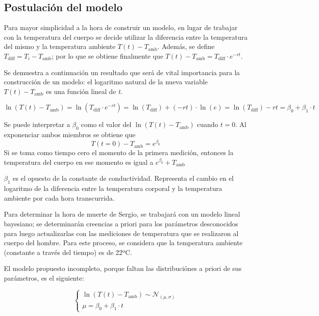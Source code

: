 \documentclass[
]{article}
\begin{document}
\hypertarget{postulaciuxf3n-del-modelo}{%
\subsection{Postulación del modelo}\label{postulaciuxf3n-del-modelo}}

Para mayor simplicidad a la hora de construir un modelo, en lugar de
trabajar con la temperatura del cuerpo se decide utilizar la diferencia
entre la temperatura del mismo y la temperatura ambiente
\(T(t) - T_{\mathrm{amb}}\). Además, se define
\(T_{\mathrm{diff}} = T_i - T_{\mathrm{amb}}\); por lo que se obtiene
finalmente que
\(T(t) - T_{\mathrm{amb}} = T_{\mathrm{diff}} \cdot e ^ {-rt}\).

Se demuestra a continuación un resultado que será de vital importancia
para la construcción de un modelo: el logaritmo natural de la nueva
variable \(T(t) - T_{\mathrm{amb}}\) es una función lineal de \emph{t}.

\[ \ln(T(t) - T_{\mathrm{amb}}) = \ln( T_{\mathrm{diff}} \cdot e^{-rt}) = \ln(T_{\mathrm{diff}}) + (-rt) \cdot \ln (e) = \ln(T_{\mathrm{diff}}) - rt = \beta_{0} + \beta_{1}\cdot t \tag{2}\]

Se puede interpretar a \(\beta_{0}\) como el valor del
\(\ln(T(t) - T_{\mathrm{amb}})\) cuando \(t=0\). Al exponenciar ambos
miembros se obtiene que \[ T(t=0) - T_{\mathrm{amb}} = e^{\beta_0}\] Si
se toma como tiempo cero el momento de la primera medición, entonces la
temperatura del cuerpo en ese momento es igual a
\(e^{\beta_0} + T_{\mathrm{amb}}\)

\(\beta_1\) es el opuesto de la constante de conductividad. Representa
el cambio en el logaritmo de la diferencia entre la temperatura corporal
y la temperatura ambiente por cada hora transcurrida.

Para determinar la hora de muerte de Sergio, se trabajará con un modelo
lineal bayesiano; se determinarán creencias a priori para los parámetros
desconocidos para luego actualizarlas con las mediciones de temperatura
que se realizaron al cuerpo del hombre. Para este proceso, se considera
que la temperatura ambiente (constante a través del tiempo) es de 22ºC.

El modelo propuesto incompleto, porque faltan las distribuciónes a
priori de sus parámetros, es el siguiente:

\[
\begin{cases} 
\ln(T(t) - T_{\mathrm{amb}}) \sim\mathcal{N}_{(\mu, \sigma)} \\
\mu = \beta_{0} + \beta_{1}\cdot t
\end{cases}
\]
\end{document}
